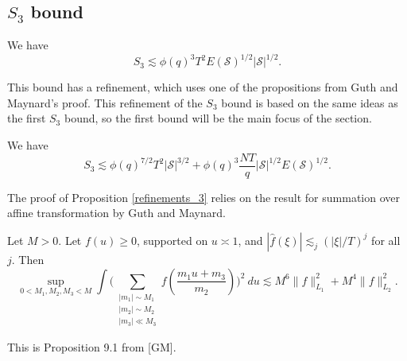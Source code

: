 
\subsection{$S_3$ bound}
\begin{proposition}\label{s_3bound}
    We have \[
    S_3 \lesssim \phi(q)^3 T^2 E(\mathcal{S})^{1/2} |\mathcal{S}|^{1/2}.
    \]
\end{proposition}
This bound has a refinement, which uses one of the propositions from Guth and Maynard's proof. This refinement of the $S_3$ bound is based on the same ideas as the first $S_3$ bound, so the first bound will be the main focus of the section.
\begin{proposition}[Refinement of $S_3$]
    \label{refinements_3}
    We have \[
    S_3\lesssim \phi(q)^{7/2}T^2|\mathcal{S}|^{3/2}+\phi(q)^{3}\frac{NT}{q}|\mathcal{S}|^{1/2}E(\mathcal{S})^{1/2}.
     \]
\end{proposition}
The proof of Proposition \ref{refinements_3} relies on the result for summation over affine transformation by Guth and Maynard.
\begin{lemma}\label{affinetrans}
    Let $M>0$. Let $f(u)\geq 0$, supported on $u\asymp 1$, and $|\hat{f}(\xi)|\lesssim_j (|\xi|/T)^j$ for all $j$. Then \[
        \sup_{0<M_1,M_2,M_3<M} \int\Bigg( \sum_{\substack{|m_1|\sim M_1\\|m_2|\sim M_2 \\ |m_3|\ll M_3}} f\left(\frac{m_1 u+m_3}{m_2}\right)\Bigg)^2 \ du \lesssim M^6 \|f\|_{L_1}^2+M^4\|f\|_{L_2}^2.
    \] 
\end{lemma}
This is Proposition 9.1 from [GM].


